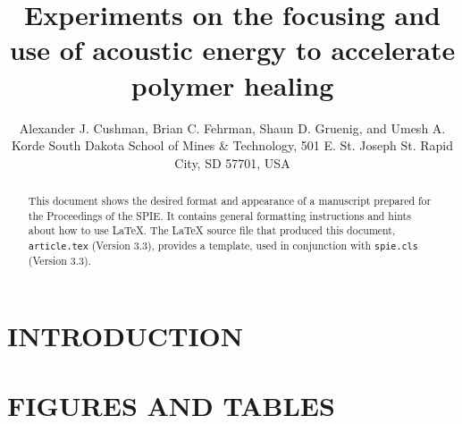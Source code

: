 \documentclass[a4paper]{spie}  %
\title{Experiments on the focusing and use of acoustic energy to accelerate polymer healing}
\author{Alexander J. Cushman\supit{a}, Brian C. Fehrman\supit{a}, Shaun D. Gruenig\supit{a}, and Umesh A. Korde\supit{a}
\skiplinehalf
\supit{a}South Dakota School of Mines \& Technology, 501 E. St. Joseph St. Rapid City, SD 57701, USA \\
}
\begin{document}
 
  \maketitle 

\begin{abstract}
This document shows the desired format and appearance of a manuscript prepared for the Proceedings of the SPIE.  It contains general formatting instructions and hints about how to use LaTeX.  The LaTeX source file that produced this document, {\tt article.tex} (Version 3.3), provides a template, used in conjunction with {\tt spie.cls} (Version 3.3).  
\end{abstract}



\section{INTRODUCTION}
\label{sec:intro}  %

\section{FIGURES AND TABLES} 
 
\end{document}
